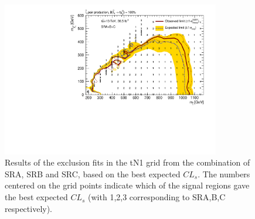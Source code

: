 \begin{figure}[htbp]
	\begin{center}
		\includegraphics[width=0.85\textwidth]{HistFitterStuff/SRABC_exclusion.pdf}
		\caption{Results of the exclusion fits in the tN1 grid from the
      combination of SRA, SRB and SRC, based on the best
      expected $CL_s$. The numbers centered on the grid points
      indicate which of the signal regions gave the best
      expected $CL_s$ (with 1,2,3 corresponding to SRA,B,C
      respectively).}
		\label{figure.exclusion.SRABC}
	\end{center}
\end{figure}


